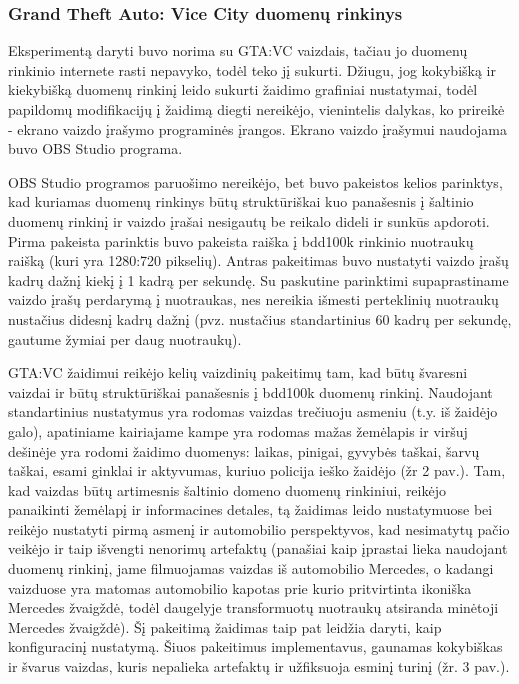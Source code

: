 \documentclass{VUMIFPSkursinis}
\begin{document}
        \subsubsection{Grand Theft Auto: Vice City duomenų rinkinys}
            Eksperimentą daryti buvo norima su GTA:VC vaizdais, tačiau jo duomenų rinkinio internete rasti nepavyko, todėl teko jį sukurti. Džiugu, jog kokybišką ir kiekybišką duomenų rinkinį leido sukurti žaidimo grafiniai nustatymai, todėl papildomų modifikacijų į žaidimą diegti nereikėjo, vienintelis dalykas, ko prireikė - ekrano vaizdo įrašymo programinės įrangos. Ekrano vaizdo įrašymui naudojama buvo OBS Studio programa.
            
            OBS Studio programos paruošimo nereikėjo, bet buvo pakeistos kelios parinktys, kad kuriamas duomenų rinkinys būtų struktūriškai kuo panašesnis į šaltinio duomenų rinkinį ir vaizdo įrašai nesigautų be reikalo dideli ir sunkūs apdoroti. Pirma pakeista parinktis buvo pakeista raiška į bdd100k rinkinio nuotraukų raišką (kuri yra 1280:720 pikselių). Antras pakeitimas buvo nustatyti vaizdo įrašų kadrų dažnį kiekį į 1 kadrą per sekundę. Su paskutine parinktimi supaprastiname vaizdo įrašų perdarymą į nuotraukas, nes nereikia išmesti perteklinių nuotraukų nustačius didesnį kadrų dažnį (pvz. nustačius standartinius 60 kadrų per sekundę, gautume žymiai per daug nuotraukų).
            
            GTA:VC žaidimui reikėjo kelių vaizdinių pakeitimų tam, kad būtų švaresni vaizdai ir būtų struktūriškai panašesnis į bdd100k duomenų rinkinį. Naudojant standartinius nustatymus yra rodomas vaizdas trečiuoju asmeniu (t.y. iš žaidėjo galo), apatiniame kairiajame kampe yra rodomas mažas žemėlapis ir viršuj dešinėje yra rodomi žaidimo duomenys: laikas, pinigai, gyvybės taškai, šarvų taškai, esami ginklai ir aktyvumas, kuriuo policija ieško žaidėjo (žr 2 pav.). Tam, kad vaizdas būtų artimesnis šaltinio domeno duomenų rinkiniui, reikėjo panaikinti žemėlapį ir informacines detales, tą žaidimas leido nustatymuose bei reikėjo nustatyti pirmą asmenį ir automobilio perspektyvos, kad nesimatytų pačio veikėjo ir taip išvengti nenorimų artefaktų (panašiai kaip įprastai lieka naudojant \cite{DaimCityDaSe} duomenų rinkinį, jame filmuojamas vaizdas iš automobilio Mercedes, o kadangi vaizduose yra matomas automobilio kapotas prie kurio pritvirtinta ikoniška Mercedes žvaigždė, todėl daugelyje transformuotų nuotraukų atsiranda minėtoji Mercedes žvaigždė). Šį pakeitimą žaidimas taip pat leidžia daryti, kaip konfiguracinį nustatymą. Šiuos pakeitimus implementavus, gaunamas kokybiškas ir švarus vaizdas, kuris nepalieka artefaktų ir užfiksuoja esminį turinį (žr. 3 pav.).
            
\end{document}
